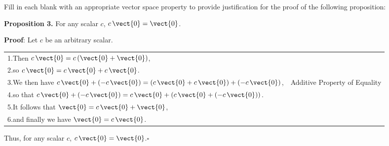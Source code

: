 Fill in each blank with an appropriate vector space property to provide justification for the proof of the following proposition:\par
%
{\bf Proposition 3.} 
For any scalar $c$,  $c\,\vect{0} = \vect{0}$.\par
%
{\bf Proof}: Let $c$ be an arbitrary scalar.\par
%
\begin{tabular}{ll}
1.\quad Then $c\,\vect{0} = c\left(\vect{0} + \vect{0}\right)$,&\underline{\hspace*{2.0in}}\\
2.\quad so $c\,\vect{0} = c\, \vect{0} + c\,\vect{0}$.&\underline{\hspace*{2.0in}}\\
3.\quad We then have $c\, \vect{0} + (-c\, \vect{0}) = (c\,\vect{0} + c\, \vect{0}) + (-c\, \vect{0})$,&Additive Property of Equality\\
4.\quad so that $c\, \vect{0} + (-c\,\vect{0}) = c\,\vect{0} + \left(c\, \vect{0} + (-c\,\vect{0})\right)$.&\underline{\hspace*{2.0in}}\\
5.\quad It follows that $\vect{0} = c\,\vect{0} + \vect{0}$,&\underline{\hspace*{2.0in}}\\
6.\quad and finally we have $\vect{0} = c\,\vect{0}$.&\underline{\hspace*{2.0in}}\\
\end{tabular}\par
%
Thus, for any scalar $c$,  $c\,\vect{0} = \vect{0}$.\quad$\square$